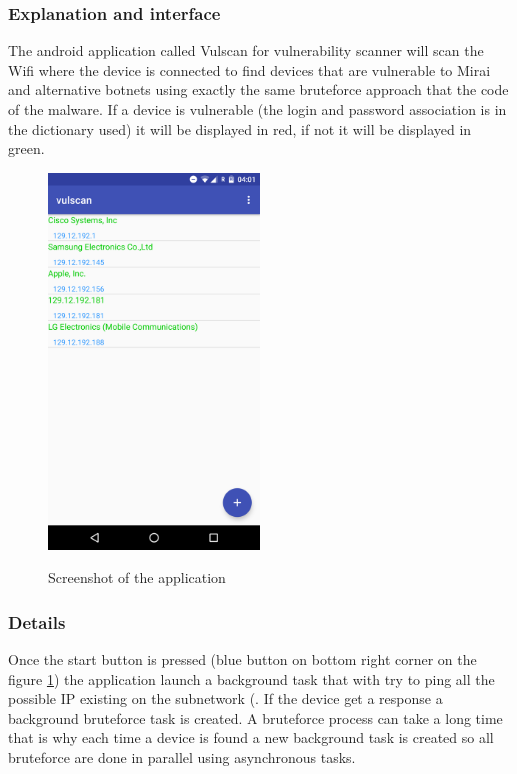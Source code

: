 \documentclass{report}
\begin{document}
\subsubsection{Explanation and interface}
The android application called Vulscan for vulnerability scanner will scan the Wifi where the device is connected to find devices that are vulnerable to Mirai and alternative botnets using exactly the same bruteforce approach that the code of the malware. If a device is vulnerable (the login and password association is in the dictionary used) it will be displayed in red, if not it will be displayed in green.
\begin{figure}[h]
 \caption{Screenshot of the application}
 \centering
 \includegraphics[width=0.5\textwidth]{./img/screen-act}
 \label{fig:screen-act}
\end{figure}

\subsubsection{Details}
Once the start button is pressed (blue button on bottom right corner on the figure \ref{fig:screen-act}) the application launch a background task that with try to ping all the possible IP existing on the subnetwork (. If the device get a response a background bruteforce task is created. A bruteforce process can take a long time that is why each time a device is found a new background task is created so all bruteforce are done in parallel using asynchronous tasks.
\end{document}
